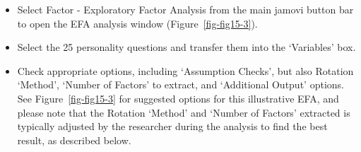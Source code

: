 \documentclass[
  a4paper,
]{book}
\begin{document}
\begin{itemize}
\item
  Select Factor - Exploratory Factor Analysis from the main jamovi
  button bar to open the EFA analysis window (Figure~\ref{fig-fig15-3}).
\item
  Select the 25 personality questions and transfer them into the
  `Variables' box.
\item
  Check appropriate options, including `Assumption Checks', but also
  Rotation `Method', `Number of Factors' to extract, and `Additional
  Output' options. See Figure~\ref{fig-fig15-3} for suggested options
  for this illustrative EFA, and please note that the Rotation `Method'
  and `Number of Factors' extracted is typically adjusted by the
  researcher during the analysis to find the best result, as described
  below.
\end{itemize}
\end{document}
